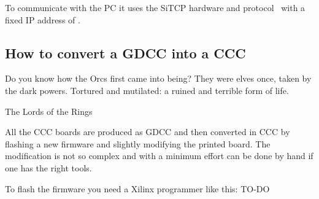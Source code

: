To communicate with the PC it uses the SiTCP hardware and protocol~\cite{Uchida:2008}
with a fixed IP address of .
\subsection{How to convert a GDCC into a CCC}
\epigraph{Do you know how the Orcs first came into being? They were elves once,
  taken by the dark powers. Tortured and mutilated: a ruined and terrible form
  of life.}{The Lords of the Rings} All the CCC boards are produced as GDCC and
then converted in CCC by flashing a new firmware and slightly modifying the
printed board. The modification is not so complex and with a minimum effort can
be done by hand if one has the right tools.

To flash the firmware you need a Xilinx programmer like this: TO-DO

